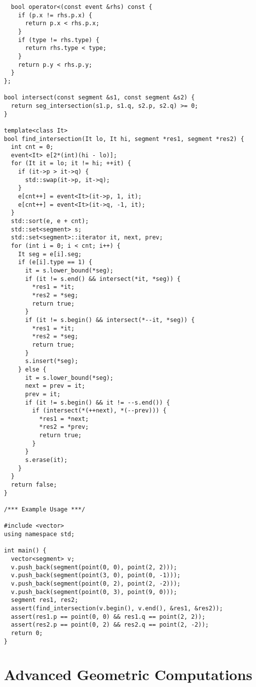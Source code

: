 \begin{lstlisting}
  bool operator<(const event &rhs) const {
    if (p.x != rhs.p.x) {
      return p.x < rhs.p.x;
    }
    if (type != rhs.type) {
      return rhs.type < type;
    }
    return p.y < rhs.p.y;
  }
};

bool intersect(const segment &s1, const segment &s2) {
  return seg_intersection(s1.p, s1.q, s2.p, s2.q) >= 0;
}

template<class It>
bool find_intersection(It lo, It hi, segment *res1, segment *res2) {
  int cnt = 0;
  event<It> e[2*(int)(hi - lo)];
  for (It it = lo; it != hi; ++it) {
    if (it->p > it->q) {
      std::swap(it->p, it->q);
    }
    e[cnt++] = event<It>(it->p, 1, it);
    e[cnt++] = event<It>(it->q, -1, it);
  }
  std::sort(e, e + cnt);
  std::set<segment> s;
  std::set<segment>::iterator it, next, prev;
  for (int i = 0; i < cnt; i++) {
    It seg = e[i].seg;
    if (e[i].type == 1) {
      it = s.lower_bound(*seg);
      if (it != s.end() && intersect(*it, *seg)) {
        *res1 = *it;
        *res2 = *seg;
        return true;
      }
      if (it != s.begin() && intersect(*--it, *seg)) {
        *res1 = *it;
        *res2 = *seg;
        return true;
      }
      s.insert(*seg);
    } else {
      it = s.lower_bound(*seg);
      next = prev = it;
      prev = it;
      if (it != s.begin() && it != --s.end()) {
        if (intersect(*(++next), *(--prev))) {
          *res1 = *next;
          *res2 = *prev;
          return true;
        }
      }
      s.erase(it);
    }
  }
  return false;
}

/*** Example Usage ***/

#include <vector>
using namespace std;

int main() {
  vector<segment> v;
  v.push_back(segment(point(0, 0), point(2, 2)));
  v.push_back(segment(point(3, 0), point(0, -1)));
  v.push_back(segment(point(0, 2), point(2, -2)));
  v.push_back(segment(point(0, 3), point(9, 0)));
  segment res1, res2;
  assert(find_intersection(v.begin(), v.end(), &res1, &res2));
  assert(res1.p == point(0, 0) && res1.q == point(2, 2));
  assert(res2.p == point(0, 2) && res2.q == point(2, -2));
  return 0;
}
\end{lstlisting}

\section{Advanced Geometric Computations}
\setcounter{section}{4}
\setcounter{subsection}{0}
